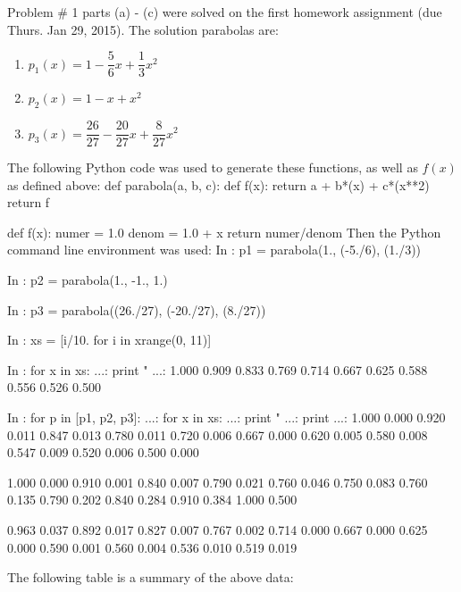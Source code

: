 \documentclass[12pt]{article}
\newenvironment{qv}
{\quote\Verbatim}
{\endVerbatim\endquote}
\begin{document}
\noindent Problem \# 1 parts (a) - (c) were solved on the first homework assignment (due Thurs. Jan 29, 2015).  The solution parabolas are:
\begin{enumerate}[\ (a)\ ]
\item $p_1(x) = 1 - \dfrac{5}{6}x + \dfrac{1}{3}x^2$
\item $p_2(x) = 1 - x + x^2$
\item $p_3(x) = \dfrac{26}{27} - \dfrac{20}{27}x + \dfrac{8}{27}x^2$
\end{enumerate}
The following Python code was used to generate these functions, as well as $f(x)$ as defined above:
\begin{qv}
def parabola(a, b, c):
    def f(x):
        return a + b*(x) + c*(x**2)
    return f

def f(x):
    numer = 1.0
    denom = 1.0 + x
    return numer/denom
\end{qv}
Then the Python command line environment was used:
\begin{qv}
In : p1 = parabola(1., (-5./6), (1./3))

In : p2 = parabola(1., -1., 1.)

In : p3 = parabola((26./27), (-20./27), (8./27))

In : xs = [i/10. for i in xrange(0, 11)]

In : for x in xs:
...:     print "%
...:
1.000
0.909
0.833
0.769
0.714
0.667
0.625
0.588
0.556
0.526
0.500

In : for p in [p1, p2, p3]:
...:     for x in xs:
...:         print "%
...:     print
...:
1.000    0.000
0.920    0.011
0.847    0.013
0.780    0.011
0.720    0.006
0.667    0.000
0.620    0.005
0.580    0.008
0.547    0.009
0.520    0.006
0.500    0.000

1.000    0.000
0.910    0.001
0.840    0.007
0.790    0.021
0.760    0.046
0.750    0.083
0.760    0.135
0.790    0.202
0.840    0.284
0.910    0.384
1.000    0.500

0.963    0.037
0.892    0.017
0.827    0.007
0.767    0.002
0.714    0.000
0.667    0.000
0.625    0.000
0.590    0.001
0.560    0.004
0.536    0.010
0.519    0.019

\end{qv}
The following table is a summary of the above data:
\end{document}
